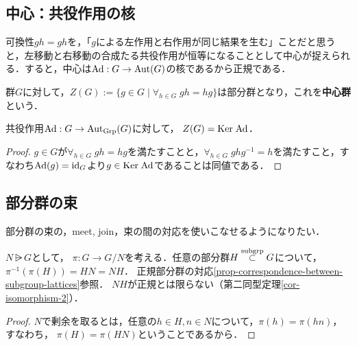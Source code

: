\documentclass[uplatex,dvipdfmx]{jsreport}
\begin{document}
\subsection{中心：共役作用の核}

\begin{tcolorbox}[colframe=ForestGreen, colback=ForestGreen!10!white,breakable,colbacktitle=ForestGreen!40!white,coltitle=black,fonttitle=\bfseries\sffamily,
title=]
    可換性$gh=gh$を，「$g$による左作用と右作用が同じ結果を生む」ことだと思うと，左移動と右移動の合成たる共役作用が恒等になることとして中心が捉えられる．すると，中心は$\mathrm{Ad}:G\to\mathrm{Aut}(G)$の核であるから正規である．
\end{tcolorbox}

\begin{definition}
    群$G$に対して，$Z(G):=\{g\in G\mid \forall_{h\in G}\;gh=hg\}$は部分群となり，これを\textbf{中心群}という．
\end{definition}

\begin{lemma}
    共役作用$\mathrm{Ad}:G\to\mathrm{Aut}_{\mathrm{Grp}}(G)$に対して，
    $Z(G)=\mathrm{Ker}\;\mathrm{Ad}$．
\end{lemma}
\begin{proof}
    $g\in G$が$\forall_{h\in G}\;gh=hg$を満たすことと，$\forall_{h\in G}\;ghg^{-1}=h$を満たすこと，すなわち$\mathrm{Ad}(g)=\mathrm{id}_G$より$g\in\mathrm{Ker}\;\mathrm{Ad}$であることは同値である．
\end{proof}

\subsection{部分群の束}

\begin{tcolorbox}[colframe=ForestGreen, colback=ForestGreen!10!white,breakable,colbacktitle=ForestGreen!40!white,coltitle=black,fonttitle=\bfseries\sffamily,
title=]
    部分群の束の，meet, join，束の間の対応を使いこなせるようになりたい．
\end{tcolorbox}

\begin{lemma}\label{lemma-retraction-of-epi}
    $N\rsub G$として，
    $\pi:G\to G/N$を考える．任意の部分群$H\overset{\mathrm{subgrp}}{\subset} G$について，
    $\pi^{-1}(\pi(H))=HN=NH$．
    正規部分群の対応\ref{prop-correspondence-between-subgroup-lattices}参照．
    $NH$が正規とは限らない（第二同型定理\ref{cor-isomorphism-2}）．
\end{lemma}
\begin{proof}
    $N$で剰余を取るとは，任意の$h\in H,n\in N$について，$\pi(h)=\pi(hn)$，すなわち，
    $\pi(H)=\pi(HN)$ということであるから．
\end{proof}
\end{document}
